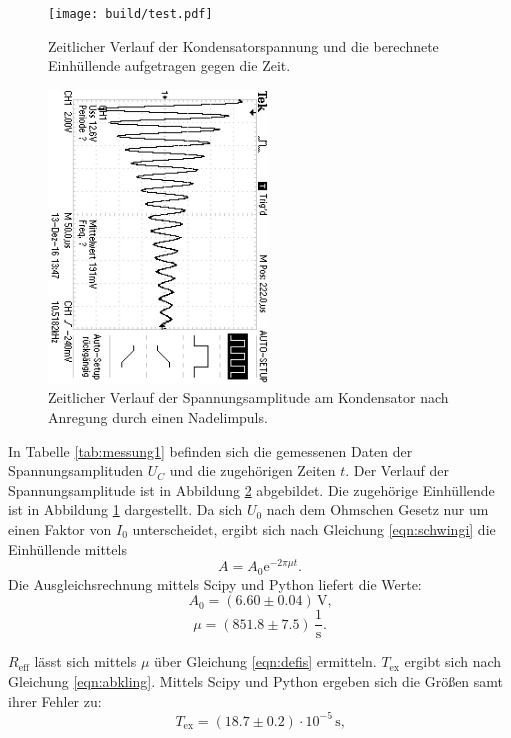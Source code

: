 \begin{figure}
	\centering
	\texttt{[image: build/test.pdf]}
	\caption{Zeitlicher Verlauf der Kondensatorspannung und die berechnete Einhüllende aufgetragen gegen die Zeit.}
	\label{fig:einhüllende}
\end{figure}
\begin{figure}
	\centering
	\includegraphics[width=0.52\textwidth,angle=90]{Bilder/a)correct/F0002TEK.JPG}
	\caption{Zeitlicher Verlauf der Spannungsamplitude am Kondensator nach Anregung durch einen Nadelimpuls.}
	\label{fig:spannungsamplitude}
\end{figure}
In Tabelle \ref{tab:messung1} befinden sich die gemessenen Daten der Spannungsamplituden $U_C$ und die zugehörigen Zeiten $t$.
Der Verlauf der Spannungsamplitude ist in Abbildung \ref{fig:spannungsamplitude} abgebildet. Die zugehörige Einhüllende ist in Abbildung \ref{fig:einhüllende} dargestellt.
Da sich $U_\text{0}$ nach dem Ohmschen Gesetz nur um einen Faktor von $I_\text{0}$ unterscheidet, ergibt sich nach Gleichung \eqref{eqn:schwingi} die Einhüllende mittels
\begin{equation}
	A=A_\text{0} \mathrm{e}^{-2 \pi \mu t} \text{.}
\end{equation}
Die Ausgleichsrechnung mittels Scipy und Python liefert die Werte:
\begin{equation*}
	A_0 =  (6.60 \pm 0.04) \,\si{\volt} \text{,}
\end{equation*}
\begin{equation*}
	\mu =  (851.8 \pm 7.5) \, \frac{1}{\si{\second}} \text{.}
\end{equation*}

$R_\text{eff}$ lässt sich mittels $\mu$ über Gleichung \eqref{eqn:defis} ermitteln. $T_\text{ex}$ ergibt sich nach Gleichung \eqref{eqn:abkling}.
Mittels Scipy und Python ergeben sich die Größen samt ihrer Fehler zu:
\begin{equation*}
	T_{\text{ex}}=(18.7 \pm 0.2) \cdot 10^{-5}\,\si{\second} \text{,}
\end{equation*}

